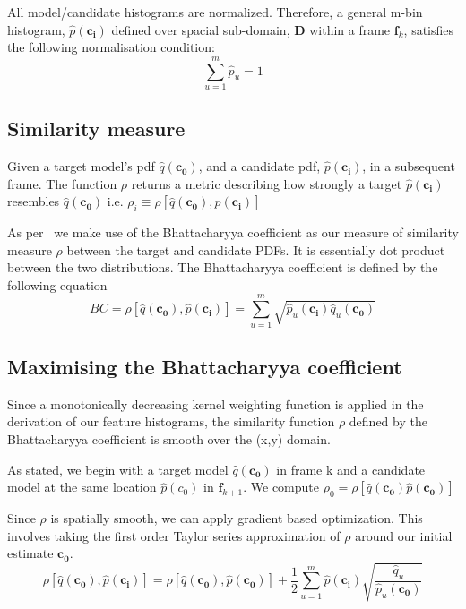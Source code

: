 All model/candidate histograms are normalized. Therefore, a general m-bin
histogram, $\hat{p}(\mathbf{c_i})$ defined over spacial sub-domain, $\mathbf{D}$
within a frame $\mathbf{f}_k$, satisfies the following normalisation condition:
\[\sum_{u=1}^{m}\hat{p}_u = 1\]

\subsection{Similarity measure}
Given a target model's pdf $\hat{q}(\mathbf{c_0})$, and a candidate pdf,
$\hat{p}(\mathbf{c_i})$, in a subsequent frame.  The function $\rho$ returns a
metric describing how strongly a target $\hat{p}(\mathbf{c_i})$ resembles
$\hat{q}(\mathbf{c_0})$ i.e.
$\rho_i \equiv \rho[\hat{q}(\mathbf{c_0}),\hat{p}(\mathbf{c_i})]$

As per~\cite{Comaniciu2003} we make use of the Bhattacharyya coefficient as our
measure of similarity measure $\rho$ between the target and candidate PDFs. It
is essentially dot product between the two distributions. The
Bhattacharyya coefficient is defined by the following equation
\begin{equation}\label{eqn:bhattacharyya}
    BC = \rho[\hat{q}(\mathbf{c_0}),\hat{p}(\mathbf{c_i})]=\sum_{u=1}^{m}\sqrt{\hat{p}_u(\mathbf{c_i})\hat{q}_u(\mathbf{c_0})}
\end{equation}

\subsection{Maximising the Bhattacharyya coefficient}\label{maximising_bhat}
Since a monotonically decreasing kernel weighting function is applied in the
derivation of our feature histograms, the similarity function $\rho$ defined by the
Bhattacharyya coefficient is smooth over the (x,y) domain.

As stated, we begin with a target model $\hat{q}(\mathbf{c_0})$ in frame k and a candidate
model at the same location $\hat{p}(c_0)$ in $\mathbf{f}_{k+1}$. We compute
$\rho_0=\rho[\hat{q}(\mathbf{c_0})\hat{p}(\mathbf{c_0})]$ 

Since $\rho$ is spatially smooth, we can apply gradient based optimization. This involves
taking the first order Taylor series approximation of $\rho$ around our initial
estimate $\mathbf{c_0}$. 
\begin{equation}\label{eqn:rho_taylor}
    \rho[\hat{q}(\mathbf{c_0}),\hat{p}(\mathbf{c_i})]=\rho[\hat{q}(\mathbf{c_0}),\hat{p}(\mathbf{c_0})]+\frac{1}{2}\sum_{u=1}^{m}\hat{p}(\mathbf{c_i})\sqrt{\frac{\hat{q}_u}{\hat{p}_u(\mathbf{c_0})}}
\end{equation}

